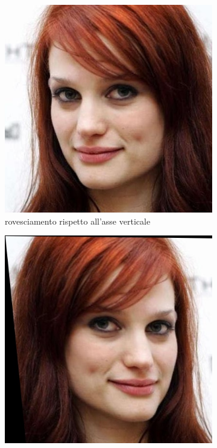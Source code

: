 \begin{figure}[ht]
\begin{subfigure}[t]{0.18\textwidth}
\includegraphics[width=\textwidth]{./Images/horizontal_flip.jpg}
\caption{rovesciamento rispetto all’asse verticale}
\label{sfig:corruption_skew}
\end{subfigure}\hfill
\begin{subfigure}[t]{0.18\textwidth}
\includegraphics[width=\textwidth]{./Images/skew.jpg}

\end{subfigure}
\end{figure}
